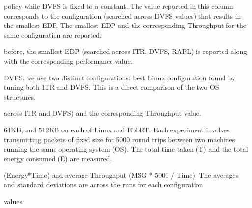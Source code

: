 policy while DVFS is fixed to a constant. The value reported in this column
corresponds to the configuration (searched across DVFS values) that results in
the smallest EDP. The smallest EDP and the corresponding Throughput for the
same configuration are reported.
            
before, the smallest EDP (searched across ITR, DVFS, RAPL) is reported along
with the corresponding performance value.
            
DVFS. we use two distinct configurations:
best Linux configuration found by tuning both ITR and DVFS. This is a direct
comparison of the two OS structures.
            
across ITR and DVFS) and the corresponding Throughput value.
            

64KB, and 512KB on each of Linux and EbbRT. Each experiment involves
transmitting packets of fixed size for 5000 round trips between two machines
running the same operating system (OS). The total time taken (T) and the total
energy consumed (E) are measured.

(Energy*Time) and average Throughput (MSG * 5000 / Time). The averages and
standard deviations are across the runs for each configuration.

values
        
